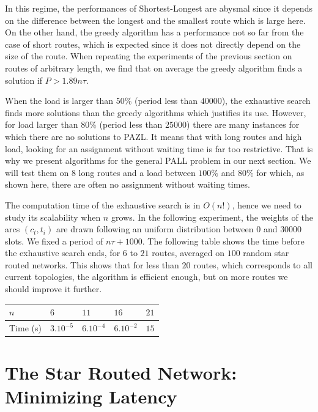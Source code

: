 \documentclass[10pt, conference, letterpaper]{IEEEtran}
\begin{document}
      In this regime, the performances of Shortest-Longest are abysmal since it depends on the difference between the longest and the smallest route which is large here. On the other hand, the greedy algorithm has a performance not so far from the case of short routes, which is expected since it does not directly depend on the size of the route. When repeating the experiments of the previous section on routes of arbitrary length, we find that on average the greedy algorithm finds a solution if $P>1.89n\tau$.
      
      When the load is larger than $50\%$ (period less than $40000$), the exhaustive search finds  more solutions than the greedy algorithms which justifies its use. However, for load larger than $80\%$ (period less than $25000$) there are many instances for which there are no solutions to PAZL.
      It means that with long routes and high load, looking for an assignment without waiting time is far too restrictive. That is why we present algorithms for the general PALL problem in our next section. We will test them on $8$ long routes and a load between $100\%$ and $80\%$ for which, as shown here, there are often no assignment without waiting times.
      
      The computation time of the exhaustive search is in $O(n!)$, hence we need to study its scalability when $n$ grows. In the following experiment, the weights of the arcs $(c_t,t_i)$ are drawn following an uniform distribution between $0$ and $30000$ slots. We fixed a period of $n\tau+1000$.
      The following table shows the time before the exhaustive search ends, for $6$ to $21$ routes, averaged on $100$ random star routed networks. This shows that for less than $20$ routes, which corresponds to all current topologies, the algorithm is efficient enough, but on more routes we should improve it further.
         \begin{center}
         \begin{tabularx}{0.5\textwidth}{|l|X|X|X|X|}
    \hline
   $n$ & $6$ & $11$& $16$& $21$\\
    \hline
   Time (s) & $3.10^{-5}$&$6.10^{-4}$&$6.10^{-2}$& $15$\\
    \hline
      \end{tabularx}
      \end{center}
      

     
   \section{The Star Routed Network: Minimizing Latency}\label{sec:PALL}
    
\end{document}
